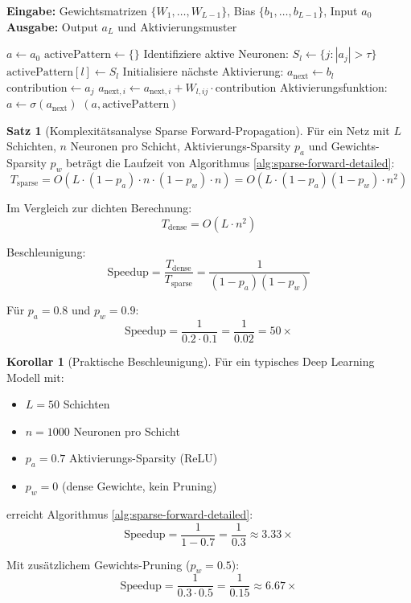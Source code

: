 ﻿\documentclass[a4paper,12pt]{report}
\theoremstyle{definition}
\newtheorem{satz}{Satz}
\newtheorem{korollar}{Korollar}
\begin{document}
	\begin{algorithm}[H]
		\caption{Sparse Forward-Propagation mit Aktivierungs-Tracking}
		\label{alg:sparse-forward-detailed}
		\textbf{Eingabe:} Gewichtsmatrizen $\{W_1, \ldots, W_{L-1}\}$, Bias $\{b_1, \ldots, b_{L-1}\}$, Input $a_0$ \\
		\textbf{Ausgabe:} Output $a_L$ und Aktivierungsmuster
		\begin{algorithmic}[1]
			\State $a \gets a_0$
			\State $\text{activePattern} \gets \{\}$ 
			\State Identifiziere aktive Neuronen: $S_l \gets \{j : |a_j| > \tau\}$
			\State $\text{activePattern}[l] \gets S_l$
			\State Initialisiere nächste Aktivierung: $a_{\text{next}} \gets b_l$ 
			 
			\State $\text{contribution} \gets a_j$
			 
			\State $a_{\text{next},i} \gets a_{\text{next},i} + W_{l,ij} \cdot \text{contribution}$
			\EndFor
			\EndFor
			\State Aktivierungsfunktion: $a \gets \sigma(a_{\text{next}})$
			\EndFor
			\State \Return $(a, \text{activePattern})$
		\end{algorithmic}
	\end{algorithm}
	
	\begin{satz}[Komplexitätsanalyse Sparse Forward-Propagation]
		Für ein Netz mit $L$ Schichten, $n$ Neuronen pro Schicht, Aktivierungs-Sparsity $p_a$ und Gewichts-Sparsity $p_w$ beträgt die Laufzeit von Algorithmus \ref{alg:sparse-forward-detailed}:
		\[
		T_{\text{sparse}} = O\left( L \cdot (1-p_a) \cdot n \cdot (1-p_w) \cdot n \right) = O(L \cdot (1-p_a)(1-p_w) \cdot n^2)
		\]
		
		Im Vergleich zur dichten Berechnung:
		\[
		T_{\text{dense}} = O(L \cdot n^2)
		\]
		
		Beschleunigung:
		\[
		\text{Speedup} = \frac{T_{\text{dense}}}{T_{\text{sparse}}} = \frac{1}{(1-p_a)(1-p_w)}
		\]
		
		Für $p_a = 0.8$ und $p_w = 0.9$:
		\[
		\text{Speedup} = \frac{1}{0.2 \cdot 0.1} = \frac{1}{0.02} = 50\times
		\]
	\end{satz}
	
	\begin{korollar}[Praktische Beschleunigung]
		Für ein typisches Deep Learning Modell mit:
		\begin{itemize}
			\item $L = 50$ Schichten
			\item $n = 1000$ Neuronen pro Schicht
			\item $p_a = 0.7$ Aktivierungs-Sparsity (ReLU)
			\item $p_w = 0$ (dense Gewichte, kein Pruning)
		\end{itemize}
		
		erreicht Algorithmus \ref{alg:sparse-forward-detailed}:
		\[
		\text{Speedup} = \frac{1}{1-0.7} = \frac{1}{0.3} \approx 3.33\times
		\]
		
		Mit zusätzlichem Gewichts-Pruning ($p_w = 0.5$):
		\[
		\text{Speedup} = \frac{1}{0.3 \cdot 0.5} = \frac{1}{0.15} \approx 6.67\times
		\]
	\end{korollar}
	
\end{document}
